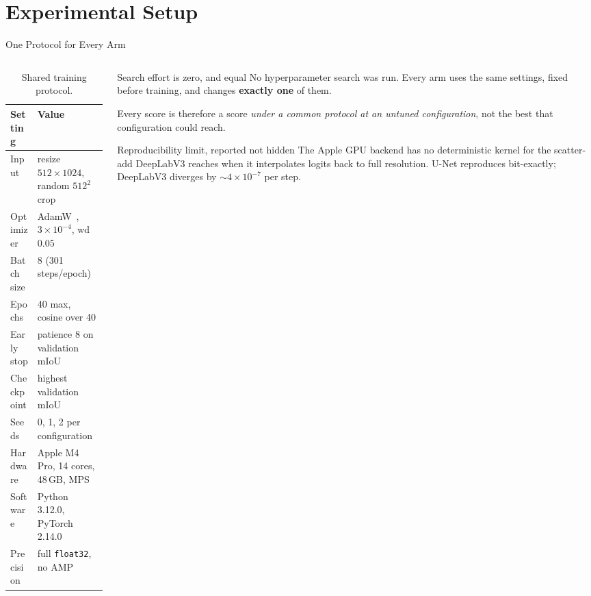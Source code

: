 
\section{Experimental Setup}

\begin{frame}{One Protocol for Every Arm}
\small
\begin{columns}[T]
\begin{column}{0.56\textwidth}
\begin{table}
\centering
\scriptsize
\caption{Shared training protocol.}
\label{tab:protocol}
\begin{tabular}{ll}
\toprule
\textbf{Setting} & \textbf{Value} \\
\midrule
Input       & resize $512\times1024$, random $512^2$ crop \\
Optimizer   & AdamW~\cite{loshchilov2019adamw}, $3\times10^{-4}$, wd $0.05$ \\
Batch size  & 8 (301 steps/epoch) \\
Epochs      & 40 max, cosine over 40 \\
Early stop  & patience 8 on validation mIoU \\
Checkpoint  & highest validation mIoU \\
Seeds       & 0, 1, 2 per configuration \\
Hardware    & Apple M4 Pro, 14 cores, 48\,GB, MPS \\
Software    & Python 3.12.0, PyTorch 2.14.0 \\
Precision   & full \texttt{float32}, no AMP \\
\bottomrule
\end{tabular}
\end{table}
\end{column}
\begin{column}{0.42\textwidth}
\begin{block}{Search effort is zero, and equal}
\footnotesize
No hyperparameter search was run. Every arm uses the same settings, fixed before training, and
changes \textbf{exactly one} of them.

Every score is therefore a score \emph{under a common protocol at an untuned configuration}, not
the best that configuration could reach.
\end{block}

\begin{alertblock}{Reproducibility limit, reported not hidden}
\footnotesize
The Apple GPU backend has no deterministic kernel for the scatter-add DeepLabV3 reaches when it
interpolates logits back to full resolution. U-Net reproduces bit-exactly; DeepLabV3 diverges by
${\sim}4\times10^{-7}$ per step.
\end{alertblock}
\end{column}
\end{columns}
\end{frame}

